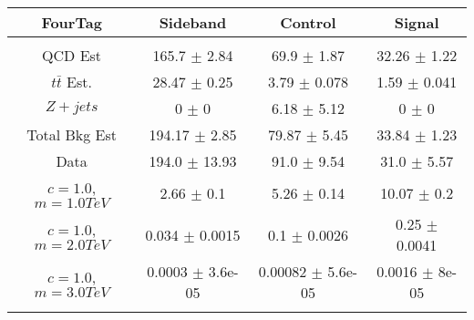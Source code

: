 \begin{footnotesize} 
\begin{tabular}{c|c|c|c} 
FourTag & Sideband & Control & Signal \\ 
\hline\hline 
& & & \\ 
QCD Est & 165.7 $\pm$ 2.84 & 69.9 $\pm$ 1.87 & 32.26 $\pm$ 1.22\\ 
$t\bar{t}$ Est.  & 28.47 $\pm$ 0.25 & 3.79 $\pm$ 0.078 & 1.59 $\pm$ 0.041\\ 
$Z+jets$ & 0 $\pm$ 0 & 6.18 $\pm$ 5.12 & 0 $\pm$ 0\\ 
Total Bkg Est & 194.17 $\pm$ 2.85 & 79.87 $\pm$ 5.45 & 33.84 $\pm$ 1.23\\ 
Data & 194.0 $\pm$ 13.93 & 91.0 $\pm$ 9.54 & 31.0 $\pm$ 5.57\\ 
$c=1.0$,$m=1.0TeV$ & 2.66 $\pm$ 0.1 & 5.26 $\pm$ 0.14 & 10.07 $\pm$ 0.2\\ 
$c=1.0$,$m=2.0TeV$ & 0.034 $\pm$ 0.0015 & 0.1 $\pm$ 0.0026 & 0.25 $\pm$ 0.0041\\ 
$c=1.0$,$m=3.0TeV$ & 0.0003 $\pm$ 3.6e-05 & 0.00082 $\pm$ 5.6e-05 & 0.0016 $\pm$ 8e-05\\ 
& & & \\ 
\hline\hline 
\end{tabular} 
\end{footnotesize} 
\newline 
